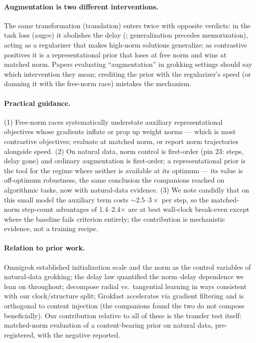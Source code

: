 \documentclass[11pt]{article}
\begin{document}
\paragraph{Augmentation is two different interventions.} The same transformation (translation)
enters twice with opposite verdicts: in the task loss (augce) it abolishes the delay
(\pfAugceMedSpeed; generalization precedes memorization), acting as a regularizer that makes
high-norm solutions generalize; as contrastive positives it is a representational prior that
loses at free norm and wins at matched norm. Papers evaluating ``augmentation'' in grokking
settings should say which intervention they mean; crediting the prior with the regularizer's
speed (or damning it with the free-norm race) mistakes the mechanism.

\paragraph{Practical guidance.} (1) Free-norm races systematically understate auxiliary
representational objectives whose gradients inflate or prop up weight norms --- which is most
contrastive objectives; evaluate at matched norm, or report norm trajectories alongside speed.
(2) On natural data, norm control is first-order (pin 23: \pfClampFloor{} steps, delay gone)
and ordinary augmentation is first-order; a representational prior is the tool for the regime
where neither is available at its optimum --- its value is off-optimum robustness, the same
conclusion the companions reached on algorithmic tasks, now with natural-data evidence. (3) We
note candidly that on this small model the auxiliary term costs ${\sim}2.5$--$3\times$ per
step, so the matched-norm step-count advantages of 1.4--2.4$\times$ are at best wall-clock
break-even except where the baseline fails criterion entirely; the contribution is mechanistic
evidence, not a training recipe.

\paragraph{Relation to prior work.} Omnigrok \citep{liu2023omnigrok} established initialization
scale and the norm as the control variables of natural-data grokking; the delay law
\citep{weightnormdelay2026} quantified the norm--delay dependence we lean on throughout;
\citep{radialsuppression2026,twospeeds2026} decompose radial vs.\ tangential learning in ways
consistent with our clock/structure split; Grokfast \citep{lee2024grokfast} accelerates via
gradient filtering and is orthogonal to content injection (the companions found the two do not
compose beneficially). Our contribution relative to all of these is the transfer test itself:
matched-norm evaluation of a content-bearing prior on natural data, pre-registered, with the
negative reported.
\end{document}
